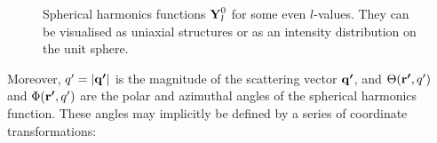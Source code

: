 \begin{figure}[h!]
    \centering
    \caption[Illustration of Spherical Harmonics]{Spherical harmonics functions $\bm{\mathrm{Y}}_{l}^{0}$ for some even $l$-values.
        They can be visualised as uniaxial structures or as an intensity distribution on the unit sphere.
    }
    \label{fig:spherical_harmonics}
\end{figure}


Moreover, $q' = |\bm{\mathrm{q'}}|$ is the magnitude of the scattering vector $\bm{\mathrm{q'}}$, and $\Theta(\bm{\mathrm{r'}}, q')$ and $\Phi(\bm{\mathrm{r'}}, q')$ are the polar and azimuthal angles of the spherical harmonics function.
These angles may implicitly be defined by a series of coordinate transformations:

